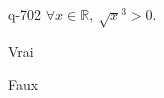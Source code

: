 \begin{truefalse}{q-702}
$\forall x \in \mathbb R,\: \sqrt x^3>0$.
\item Vrai
\item* Faux
\end{truefalse}

